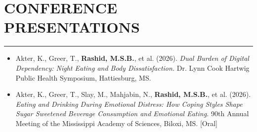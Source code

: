 \documentclass[10pt, letterpaper]{article}
\begin{document}
\begin{minipage}[t]{0.72\textwidth}
\vspace{4pt}

\section*{CONFERENCE PRESENTATIONS}\vspace{-2pt}\hrule\vspace{6pt}
\begin{itemize}
    \item Akter, K., Greer, T., \textbf{Rashid, M.S.B.}, et al. (2026). \textit{Dual Burden of Digital Dependency: Night Eating and Body Dissatisfaction.} Dr. Lynn Cook Hartwig Public Health Symposium, Hattiesburg, MS.
    \item Akter, K., Greer, T., Slay, M., Mahjabin, N., \textbf{Rashid, M.S.B.}, et al. (2026). \textit{Eating and Drinking During Emotional Distress: How Coping Styles Shape Sugar Sweetened Beverage Consumption and Emotional Eating.} 90th Annual Meeting of the Mississippi Academy of Sciences, Biloxi, MS. [Oral]
\end{itemize}

\end{minipage}
\end{document}
